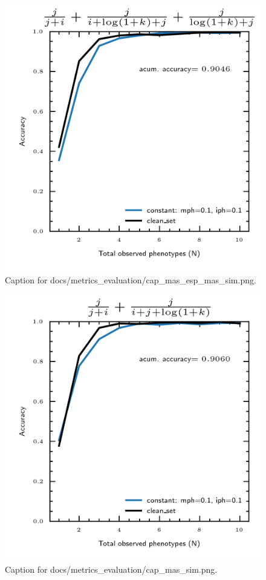 \documentclass{article}
\begin{document}
\begin{figure}[h] \centering \includegraphics{docs/metrics_evaluation/cap_mas_esp_mas_sim.png} \caption{Caption for docs/metrics_evaluation/cap_mas_esp_mas_sim.png.} \end{figure}
\begin{figure}[h] \centering \includegraphics{docs/metrics_evaluation/cap_mas_sim.png} \caption{Caption for docs/metrics_evaluation/cap_mas_sim.png.} \end{figure}
\end{document}
